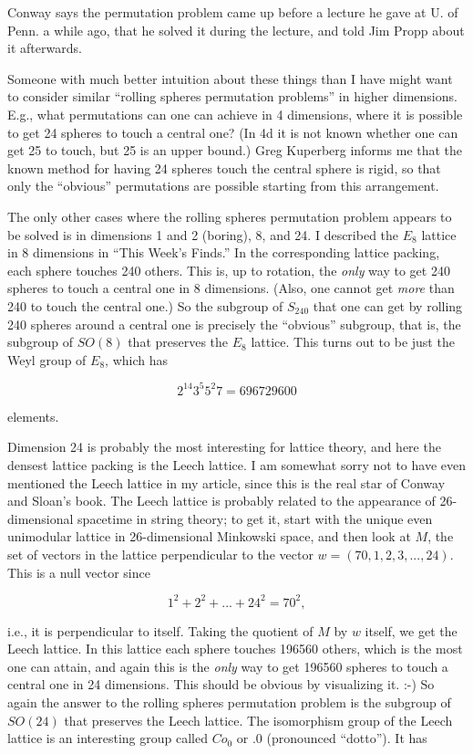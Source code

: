 \documentclass{article}
\begin{document}
Conway says the permutation problem came up before a lecture he gave at
U. of Penn. a while ago, that he solved it during the lecture, and told
Jim Propp about it afterwards.

Someone with much better intuition about these things than I have might
want to consider similar ``rolling spheres permutation problems'' in
higher dimensions. E.g., what permutations can one can achieve in 4
dimensions, where it is possible to get 24 spheres to touch a central
one? (In 4d it is not known whether one can get 25 to touch, but 25 is
an upper bound.) Greg Kuperberg informs me that the known method for
having 24 spheres touch the central sphere is rigid, so that only the
``obvious'' permutations are possible starting from this arrangement.

The only other cases where the rolling spheres permutation problem
appears to be solved is in dimensions 1 and 2 (boring), 8, and 24. I
described the \(E_8\) lattice in 8 dimensions in ``This Week's Finds.''
In the corresponding lattice packing, each sphere touches 240 others.
This is, up to rotation, the \emph{only} way to get 240 spheres to touch
a central one in 8 dimensions. (Also, one cannot get \emph{more} than
240 to touch the central one.) So the subgroup of \(S_{240}\) that one
can get by rolling 240 spheres around a central one is precisely the
``obvious'' subgroup, that is, the subgroup of \(SO(8)\) that preserves
the \(E_8\) lattice. This turns out to be just the Weyl group of
\(E_8\), which has

\[2^14 3^5 5^2 7 = 696729600\]

elements.

Dimension 24 is probably the most interesting for lattice theory, and
here the densest lattice packing is the Leech lattice. I am somewhat
sorry not to have even mentioned the Leech lattice in my article, since
this is the real star of Conway and Sloan's book. The Leech lattice is
probably related to the appearance of 26-dimensional spacetime in string
theory; to get it, start with the unique even unimodular lattice in
26-dimensional Minkowski space, and then look at \(M\), the set of
vectors in the lattice perpendicular to the vector
\(w = (70,1,2,3,...,24)\). This is a null vector since

\[1^2 + 2^2 + ... + 24^2 = 70^2,\]

i.e., it is perpendicular to itself. Taking the quotient of \(M\) by
\(w\) itself, we get the Leech lattice. In this lattice each sphere
touches 196560 others, which is the most one can attain, and again this
is the \emph{only} way to get 196560 spheres to touch a central one in
24 dimensions. This should be obvious by visualizing it. :-) So again
the answer to the rolling spheres permutation problem is the subgroup of
\(SO(24)\) that preserves the Leech lattice. The isomorphism group of
the Leech lattice is an interesting group called \(Co_0\) or \(.0\)
(pronounced ``dotto''). It has
\end{document}
